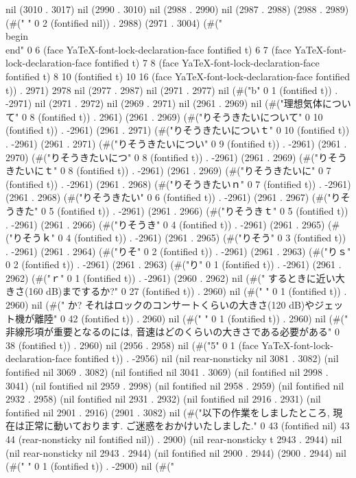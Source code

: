 {nil (3010 . 3017) nil (2990 . 3010) nil (2988 . 2990) nil (2987 . 2988) (2988 . 2989) (#("  " 0 2 (fontified nil)) . 2988) (2971 . 3004) (#("\\begin{}
 \\end{}" 0 6 (face YaTeX-font-lock-declaration-face fontified t) 6 7 (face YaTeX-font-lock-declaration-face fontified t) 7 8 (face YaTeX-font-lock-declaration-face fontified t) 8 10 (fontified t) 10 16 (face YaTeX-font-lock-declaration-face fontified t)) . 2971) 2978 nil (2977 . 2987) nil (2971 . 2977) nil (#("b" 0 1 (fontified t)) . -2971) nil (2971 . 2972) nil (2969 . 2971) nil (2961 . 2969) nil (#("理想気体について" 0 8 (fontified t)) . 2961) (2961 . 2969) (#("りそうきたいについて" 0 10 (fontified t)) . -2961) (2961 . 2971) (#("りそうきたいについｔ" 0 10 (fontified t)) . -2961) (2961 . 2971) (#("りそうきたいについ" 0 9 (fontified t)) . -2961) (2961 . 2970) (#("りそうきたいにつ" 0 8 (fontified t)) . -2961) (2961 . 2969) (#("りそうきたいにｔ" 0 8 (fontified t)) . -2961) (2961 . 2969) (#("りそうきたいに" 0 7 (fontified t)) . -2961) (2961 . 2968) (#("りそうきたいｎ" 0 7 (fontified t)) . -2961) (2961 . 2968) (#("りそうきたい" 0 6 (fontified t)) . -2961) (2961 . 2967) (#("りそうきた" 0 5 (fontified t)) . -2961) (2961 . 2966) (#("りそうきｔ" 0 5 (fontified t)) . -2961) (2961 . 2966) (#("りそうき" 0 4 (fontified t)) . -2961) (2961 . 2965) (#("りそうｋ" 0 4 (fontified t)) . -2961) (2961 . 2965) (#("りそう" 0 3 (fontified t)) . -2961) (2961 . 2964) (#("りそ" 0 2 (fontified t)) . -2961) (2961 . 2963) (#("りｓ" 0 2 (fontified t)) . -2961) (2961 . 2963) (#("り" 0 1 (fontified t)) . -2961) (2961 . 2962) (#("ｒ" 0 1 (fontified t)) . -2961) (2960 . 2962) nil (#("   するときに近い大きさ(160 dB)までするか?" 0 27 (fontified t)) . 2960) nil (#("
" 0 1 (fontified t)) . 2960) nil (#("   か? それはロックのコンサートくらいの大きさ(120 dB)やジェット機が離陸" 0 42 (fontified t)) . 2960) nil (#("
" 0 1 (fontified t)) . 2960) nil (#("   非線形項が重要となるのには, 音速はどのくらいの大きさである必要がある" 0 38 (fontified t)) . 2960) nil (2956 . 2958) nil (#("5" 0 1 (face YaTeX-font-lock-declaration-face fontified t)) . -2956) nil (nil rear-nonsticky nil 3081 . 3082) (nil fontified nil 3069 . 3082) (nil fontified nil 3041 . 3069) (nil fontified nil 2998 . 3041) (nil fontified nil 2959 . 2998) (nil fontified nil 2958 . 2959) (nil fontified nil 2932 . 2958) (nil fontified nil 2931 . 2932) (nil fontified nil 2916 . 2931) (nil fontified nil 2901 . 2916) (2901 . 3082) nil (#("以下の作業をしましたところ, 現在は正常に動いております. ご迷惑をおかけいたしました." 0 43 (fontified nil) 43 44 (rear-nonsticky nil fontified nil)) . 2900) (nil rear-nonsticky t 2943 . 2944) nil (nil rear-nonsticky nil 2943 . 2944) (nil fontified nil 2900 . 2944) (2900 . 2944) nil (#("
" 0 1 (fontified t)) . -2900) nil (#("%

}
